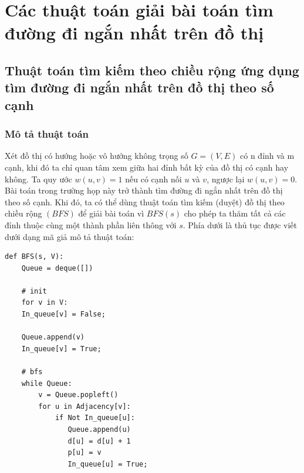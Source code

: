 \documentclass[a4paper,12pt]{report}
\begin{document}

\section{Các thuật toán giải bài toán tìm đường đi ngắn nhất trên đồ thị}
\subsection{Thuật toán tìm kiếm theo chiều rộng ứng dụng tìm đường đi ngắn nhất trên đồ thị theo số cạnh}
    \subsubsection{Mô tả thuật toán}
Xét đồ thị có hướng hoặc vô hướng không trọng số $ G = (V, E) $ có n đỉnh và m cạnh, khi đó ta chỉ quan tâm xem giữa hai đỉnh bất kỳ của đồ thị có cạnh hay không. Ta quy ước $w(u, v) = 1 $ nếu có cạnh nối $u$ và $v$, ngược lại $ w(u, v) = 0 $. Bài toán trong trường họp này trở thành tìm đường đi ngắn nhất trên đồ thị theo số cạnh. Khi đó, ta có thể dùng thuật toán tìm kiếm (duyệt) đồ thị theo chiều rộng $ (BFS) $ để giải bài toán vì $ BFS(s) $ cho phép ta thăm tất cả các đỉnh thuộc cùng một thành phần liên thông với $s$. Phía dưới là thủ tục được viết dưới dạng mã giả mô tả thuật toán:\\

\begin{verbatim}
def BFS(s, V):
    Queue = deque([])

    # init
    for v in V:
    In_queue[v] = False;

    Queue.append(v)
    In_queue[v] = True;			

    # bfs
    while Queue:
        v = Queue.popleft()
        for u in Adjacency[v]:
            if Not In_queue[u]:
               Queue.append(u)
               d[u] = d[u] + 1
               p[u] = v
               In_queue[u] = True;
\end{verbatim}
    
\end{document}
